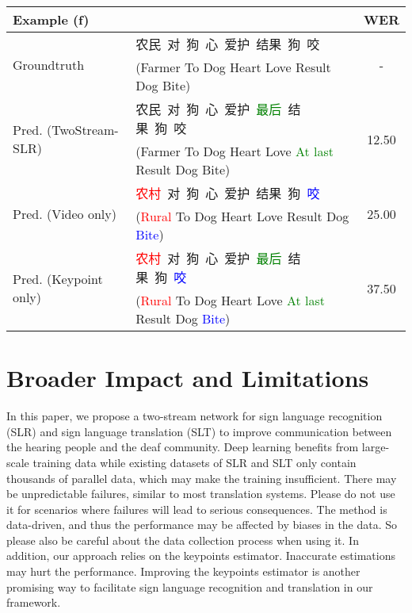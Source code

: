 \documentclass{article}
\newcommand{\sub}[1]{\textcolor{red}{#1}}
\newcommand{\del}[1]{\textcolor{blue}{#1}}
\newcommand{\ins}[1]{\textcolor{green}{#1}}
\begin{document}
\begin{CJK*}{UTF8}{gbsn}
\begin{table}[ht!]
{\begin{tabular}{l|l|c}
\midrule
\midrule
\textbf{Example (f)} & & WER \\
\midrule
\multirow{2}{*}{Groundtruth} & 农民\ 对\ 狗\ 心\ 爱护\ 结果\ 狗\ 咬\ & \multirow{2}{*}{-}\\
& (Farmer To Dog Heart Love Result Dog Bite) & \\
\midrule
\multirow{2}{*}{Pred. (TwoStream-SLR)} & 农民\ 对\ 狗\ 心\ 爱护\ \ins{最后}\ 结果\ 狗\ 咬 & \multirow{2}{*}{12.50} \\
& (Farmer To Dog Heart Love \ins{At last} Result Dog Bite) & \\
\midrule
\multirow{2}{*}{Pred. (Video only)} & \sub{农村}\ 对\ 狗\ 心\ 爱护\ 结果\ 狗\ \del{咬} & \multirow{2}{*}{25.00}\\
& (\sub{Rural} To Dog Heart Love Result Dog \del{Bite}) & \\
\midrule
\multirow{2}{*}{Pred. (Keypoint only)} & \sub{农村}\ 对\ 狗\ 心\ 爱护\ \ins{最后}\ 结果\ 狗\ \del{咬} & \multirow{2}{*}{37.50}\\
& (\sub{Rural} To Dog Heart Love \ins{At last} Result Dog \del{Bite}) & \\
\bottomrule
\end{tabular}}
\end{table}
\end{CJK*}


\section{Broader Impact and Limitations}
In this paper, we propose a two-stream network for sign language recognition (SLR) and sign language translation (SLT) to improve communication between the hearing people and the deaf community. Deep learning benefits from large-scale training data while existing datasets of SLR and SLT only contain thousands of parallel data, which may make the training insufficient. There may be unpredictable failures, similar to most translation systems. Please do not use it for scenarios where failures will lead to serious consequences. The method is data-driven, and thus the performance may be affected by biases in the data. So please also be careful about the data collection process when using it. In addition, our approach relies on the keypoints estimator. Inaccurate estimations may hurt the performance. Improving the keypoints estimator is another promising way to facilitate sign language recognition and translation in our framework.


 
\end{document}
